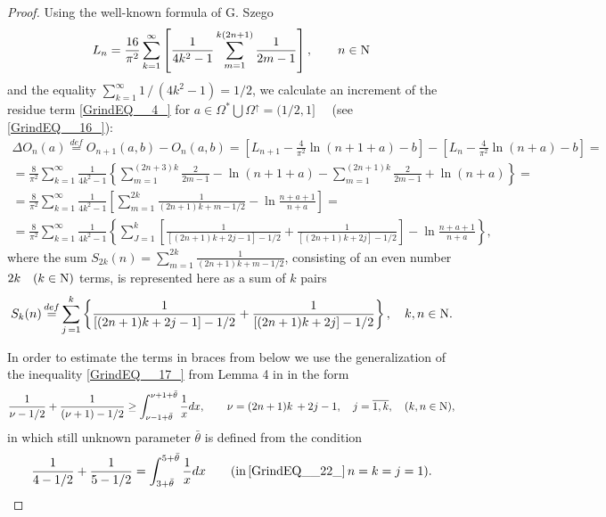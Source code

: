 \documentclass[
11pt,%
tightenlines,%
twoside,%
onecolumn,%
nofloats,%
nobibnotes,%
nofootinbib,%
superscriptaddress,%
noshowpacs,%
centertags]%
{revtex4}
\begin{document}
\begin{proof} Using the well-known formula of G. Szego \cite{Sz}
$$
L_{n}   =  \frac{16}{\pi ^{2} } \sum _{k=1}^{\infty }\left[\frac{1}{4k^{2} - 1}\sum _{m=1}^{k(2n+1)}\frac{1}{2m-1}  \right],\qquad n\in {\rm N}  
$$
and the equality $\sum _{k=1}^{\infty }1\, /\, (4k^{2} - 1)  = 1/2$, we calculate an increment of the residue term \eqref{GrindEQ__4_} for $a\in \Omega ^{*}  \bigcup \Omega ^{\uparrow } =(1/2, 1] \quad$ (see \eqref{GrindEQ__16_}):
\begin{multline*}
\Delta O_{n} (a)\mathop{=}\limits^{def}  O_{n+1} (a, b) - O_{n} (a, b) = \left[L_{n+1} - \frac{4}{\pi ^{2} }  \ln (n+1 +a) - b \right] -
\left[ L_{n} - \frac{4}{\pi ^{2} } \ln (n+a) - b \right] = \\ =
\frac{8}{\pi ^{2} }  \sum _{k=1}^{\infty }\frac{1}{4k^{2}  - 1}   \left\{\sum _{m=1}^{(2n+3)k}\frac{2}{2m-1}  - \ln (n+1+a) -
\sum _{m=1}^{(2n+1)k}\frac{2}{2m-1}   + \ln (n +a)\right\} = \\ =
\frac{8}{\pi ^{2} }  \sum _{k=1}^{\infty }\frac{1}{4k^{2}  - 1}  \left[\sum _{m=1}^{2k}\frac{1}{(2n+1)k +m-1/2}  - \ln \frac{n+a+1}{n+a}  \right] = \\ =
\frac{8}{\pi ^{2} }  \sum _{k=1}^{\infty }\frac{1}{4k^{2}  - 1}  \left\{\sum _{J=1}^{k}\left[\frac{1}{[(2n+1)k +2j-1 ]-1/2}   +  \frac{1}{[(2n+1)k +2j] -1/2} \right]    -   \ln \frac{n+a+1}{n+a} \right\},
\end{multline*}
where the sum $S_{2k} (n) =\sum _{m=1}^{2k}\frac{1}{(2n+1)k+m-1/2}$, consisting of an even number $2k\quad (k\in {\rm N} )$ terms, is represented here as a sum of $k$ pairs
\begin{equation}\label{GrindEQ__22_}
S_{k} (n)\mathop{=}\limits^{def} \sum _{j\, =1}^{k}\left\{ \frac{1}{[(2n+1)k+2j-1] - 1/2}  +\frac{1}{[(2n+1)k+2j] -1/2}  \right\},\quad k, n\in {\rm N}.
\end{equation}

In order to estimate the terms in braces from below we use the generalization of the inequality \eqref{GrindEQ__17_} from Lemma 4 in \cite{Sh19} in the form
\begin{equation}\label{GrindEQ__23_}
\frac{1}{\nu -1/2}  +\frac{1}{(\nu +1)-1/2}  \ge  \int _{\nu -1+\bar{\theta }}^{ \nu +1+\bar{\theta }} \frac{1}{x} dx,\qquad \nu =(2n+1)k\, +2j-1,\quad j= \overline{1,  k},\quad (k, n\in {\rm N} ),
\end{equation}
in which still unknown parameter $\bar{\theta }$ is defined from the condition
\begin{equation} \label{GrindEQ__24_}
\frac{1}{4  -  1/2}   +  \frac{1}{5 -  1/2}   =  \int _{   3 +\bar{\theta }}^{  5 +\bar{\theta }} \frac{1}{x}   dx \qquad(\text{in}\, \eqref{GrindEQ__22_}\, n=  k  = j =1).
\end{equation}


\end{proof}
\end{document}
